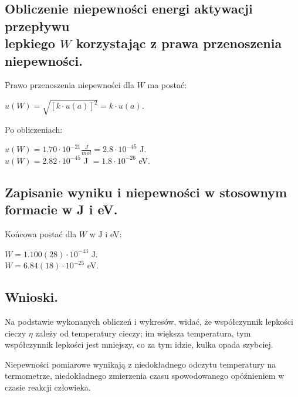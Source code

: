 \documentclass[12pt]{article}
\begin{document}
\subsection*{Obliczenie niepewności energi aktywacji przepływu \\
    lepkiego $W$ korzystając z prawa przenoszenia \\
    niepewności.}
Prawo przenoszenia niepewności dla $W$ ma postać:
\begin{center}
    $u(W) = \sqrt{[k \cdot u(a)]^2} = k \cdot u(a)$.
\end{center}
Po obliczeniach:
\begin{center}
    $u(W) = 1.70 \cdot 10^{-21} \frac{J}{mol}  = 2.8 \cdot 10^{-45}$ J. \\
    $u(W) = 2.82 \cdot 10^{-45}$ J $ = 1.8 \cdot 10^{-26}$ eV.
\end{center}

\subsection*{Zapisanie wyniku i niepewności w stosownym formacie w J i eV.}
Końcowa postać dla $W$ w J i eV: 
\begin{center}
    $W = 1.100(28) \cdot 10^{-43}$ J. \\
    $W = 6.84(18) \cdot 10^{-25}$ eV.
\end{center}

\subsection*{Wnioski.}
Na podstawie wykonanych obliczeń i wykresów, widać, że 
współczynnik lepkości cieczy $\eta$ zależy od temperatury cieczy;
im większa temperatura, tym współczynnik lepkości jest mniejszy, co
za tym idzie, kulka opada szybciej.

Niepewności pomiarowe wynikają z niedokładnego odczytu temperatury
na termometrze, niedokładnego zmierzenia czasu spowodowanego opóźnieniem
w czasie reakcji człowieka.
\end{document}
